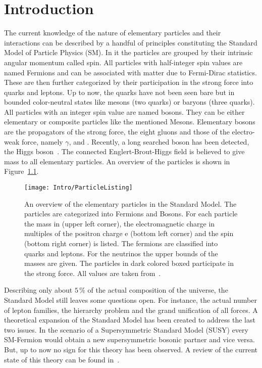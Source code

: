 \chapter{Introduction \label{sec:Intro}}

The current knowledge of the nature of elementary particles and their interactions can be described by a handful of principles constituting the Standard Model of Particle Physics (SM). In it the particles are grouped by their intrinsic angular momentum called spin. All particles with half-integer spin values are named Fermions and can be associated with matter due to Fermi-Dirac statistics. These are then further categorized by their participation in the strong force into quarks and leptons. Up to now, the quarks have not been seen bare but in bounded color-neutral states like mesons (two quarks) or baryons (three quarks). All particles with an integer spin value are named bosons. They can be either elementary or composite particles like the mentioned Mesons. Elementary bosons are the propagators of the strong force, the eight gluons and those of the electro-weak force, namely $\gamma{}$, \Zz{} and \Wpm{}. Recently, a long searched boson has been detected, the Higgs boson~\cite{Chatrchyan201230}. The connected Englert-Brout-Higgs field is believed to give mass to all elementary particles. An overview of the particles is shown in Figure~\ref{plot:IntroParticles}.

\begin{figure}[!htb]
  \centering
  \texttt{[image: Intro/ParticleListing]}
  \caption[Overview of the elementary particles]{An overview of the elementary particles in the Standard Model. The particles are categorized into Fermions and Bosons. For each particle the mass in \MeV (upper left corner), the electromagnetic charge in multiples of the positron charge e (bottom left corner) and the spin (bottom right corner) is listed. The fermions are classified into quarks and leptons. For the neutrinos the upper bounds of the masses are given. The particles in dark colored boxed participate in the strong force. All values are taken from~. \label{plot:IntroParticles} }
\end{figure}

Describing only about $5\,\%$ of the actual composition of the universe, the Standard Model still leaves some questions open. For instance, the actual number of lepton families, the hierarchy problem and the grand unification of all forces. A theoretical expansion of the Standard Model has been created to address the last two issues. In the scenario of a Supersymmetric Standard Model (SUSY) every SM-Fermion would obtain a new supersymmetric bosonic partner and vice versa. But, up to now no sign for this theory has been observed. A review of the current state of this theory can be found in~\cite{Beringer:1900zz}.

